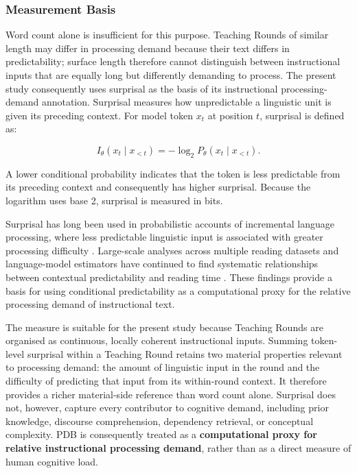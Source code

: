 \subsubsection{Measurement Basis}
\label{subsubsec:pdb-measurement-basis}

Word count alone is insufficient for this purpose. Teaching Rounds of similar length may differ in processing demand because their text differs in predictability; surface length therefore cannot distinguish between instructional inputs that are equally long but differently demanding to process. The present study consequently uses surprisal as the basis of its instructional processing-demand annotation. Surprisal measures how unpredictable a linguistic unit is given its preceding context. For model token $x_t$ at position $t$, surprisal is defined as:

\[
I_\theta(x_t \mid x_{<t})=-\log_2 P_\theta(x_t \mid x_{<t}).
\]

A lower conditional probability indicates that the token is less predictable from its preceding context and consequently has higher surprisal. Because the logarithm uses base 2, surprisal is measured in bits.

Surprisal has long been used in probabilistic accounts of incremental language processing, where less predictable linguistic input is associated with greater processing difficulty \cite{hale-2001-probabilistic,smith-levy-2013-effect}. Large-scale analyses across multiple reading datasets and language-model estimators have continued to find systematic relationships between contextual predictability and reading time \cite{shain-etal-2024-large-scale}. These findings provide a basis for using conditional predictability as a computational proxy for the relative processing demand of instructional text.

The measure is suitable for the present study because Teaching Rounds are organised as continuous, locally coherent instructional inputs. Summing token-level surprisal within a Teaching Round retains two material properties relevant to processing demand: the amount of linguistic input in the round and the difficulty of predicting that input from its within-round context. It therefore provides a richer material-side reference than word count alone. Surprisal does not, however, capture every contributor to cognitive demand, including prior knowledge, discourse comprehension, dependency retrieval, or conceptual complexity. PDB is consequently treated as a \textbf{computational proxy for relative instructional processing demand}, rather than as a direct measure of human cognitive load.

